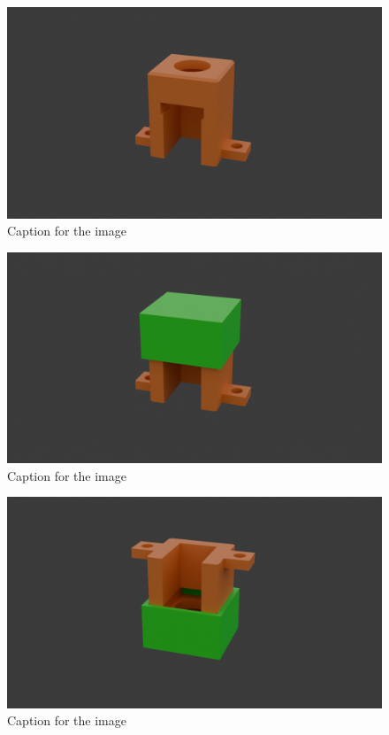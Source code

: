 \documentclass[landscape,twocolumn]{article}
\begin{document}
\pagestyle{empty} %

\begin{figure}[p]
    \centering
    \includegraphics[width=0.875\linewidth]{a.png} %
    \caption{Caption for the image}
\end{figure}


\begin{figure}[p]
    \centering
    \includegraphics[width=0.875\linewidth]{b.png} %
    \caption{Caption for the image}
\end{figure}


\begin{figure}[p]
    \centering
    \includegraphics[width=0.875\linewidth]{c.png} %
    \caption{Caption for the image}
\end{figure}
\end{document}
